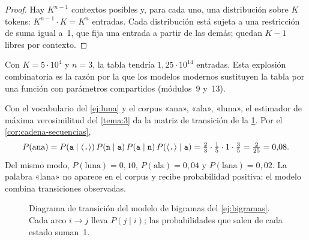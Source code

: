 \begin{proof}
Hay $K^{n-1}$ contextos posibles y, para cada uno, una distribución sobre $K$ tokens: $K^{n-1}\cdot K=K^{n}$ entradas. Cada distribución está sujeta a una restricción de suma igual a~1, que fija una entrada a partir de las demás; quedan $K-1$ libres por contexto.
\end{proof}

Con $K=5\cdot 10^{4}$ y $n=3$, la tabla tendría $1{,}25\cdot 10^{14}$ entradas. Esta explosión combinatoria es la razón por la que los modelos modernos sustituyen la tabla por una función con parámetros compartidos (módulos~9 y~13).

\begin{ejemplo}\label{ej:bigramas}
Con el vocabulario del \cref{ej:luna} y el corpus «ana», «ala», «luna», el estimador de máxima verosimilitud del \cref{tema:3} da la matriz de transición de la \cref{fig:cadena}. Por el \cref{cor:cadena-secuencias},
\[
P(\text{ana})=P(\texttt{a}\mid\langle\texttt{.}\rangle)\,P(\texttt{n}\mid\texttt{a})\,P(\texttt{a}\mid\texttt{n})\,P(\langle\texttt{.}\rangle\mid\texttt{a})=\tfrac{2}{3}\cdot\tfrac{1}{5}\cdot 1\cdot\tfrac{3}{5}=\tfrac{2}{25}=0{,}08.
\]
Del mismo modo, $P(\text{luna})=0{,}10$, $P(\text{ala})=0{,}04$ y $P(\text{lana})=0{,}02$. La palabra «lana» no aparece en el corpus y recibe probabilidad positiva: el modelo combina transiciones observadas.
\end{ejemplo}

\begin{figure}[h]
\centering
{}
\caption{Diagrama de transición del modelo de bigramas del \cref{ej:bigramas}. Cada arco $i\to j$ lleva $P(j\mid i)$; las probabilidades que salen de cada estado suman~1.}
\label{fig:cadena}
\end{figure}

